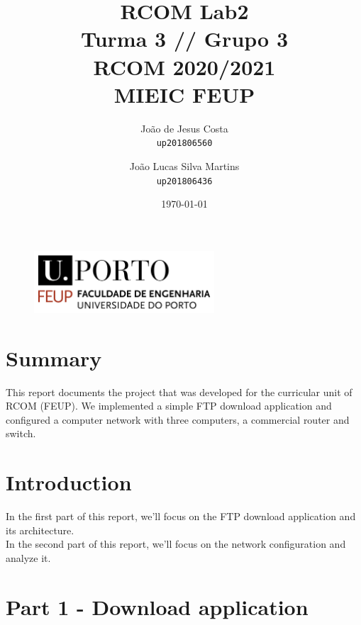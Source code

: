 \documentclass[11pt]{report}
\begin{document}
\title{\huge{\textbf{RCOM Lab2}} \\ Turma 3 // Grupo 3 \\ RCOM 2020/2021 \\ MIEIC FEUP}
\author{João de Jesus Costa \\ \texttt{up201806560} \and
	João Lucas Silva Martins \\ \texttt{up201806436}}
\date{\today{}}

\begin{figure}[b]
  \begin{center}
    \includegraphics[width=0.6\textwidth]{feup_logo.png}
  \end{center}
\end{figure}
\maketitle{}

\tableofcontents{}
\newpage

{\let\clearpage\relax\chapter{Summary}}

This report documents the project that was developed for the curricular unit
of RCOM (FEUP). We implemented a simple FTP download application and configured
a computer network with three computers, a commercial router and switch.

{\let\clearpage\relax\chapter{Introduction}}

In the first part of this report, we'll focus on the FTP download application
and its architecture.\\
In the second part of this report, we'll focus on the network configuration
and analyze it.

{\let\clearpage\relax\chapter{Part 1 - Download application}}
\end{document}

